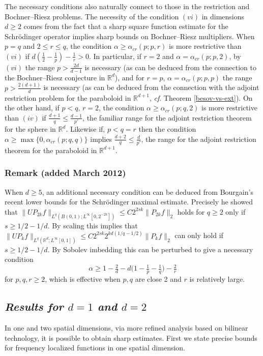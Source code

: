 \documentclass[11pt]{amsart}
\theoremstyle{definition}
\numberwithin{theorem}{section}
\numberwithin{definition}{section}
\numberwithin{equation}{section}
\renewcommand{\le}{\leqslant}
\renewcommand{\ge}{\geqslant}
\def\cf{{\it cf}}
\def\bbR{{\mathbb {R}}}
\renewcommand{\le}{\leqslant}
\renewcommand{\ge}{\geqslant}
\begin{document}
The necessary conditions also naturally  connect to those in the
restriction and Bochner--Riesz problems.
 The necessity of the condition  $(vi)$ in dimensions $d\ge 2$ comes  from
the fact that a sharp square function estimate for the Schr\"odinger
operator  implies sharp bounds on Bochner--Riesz multipliers.  When
$p=q$ and $2\le r\le q$, the condition $\alpha\ge
\alpha_{cr}(p;p,r)$
is more restrictive than
$(vi)$  if $d(\frac 12-\frac 1p)-\frac 1r>0$.
In particular, if  $r=2$ and
$\alpha= \alpha_{cr}(p;p,2)$,  by $(vi)$  the  range  $p>\frac{2d}{d-1}$
is necessary
(as can be deduced from the connection to the Bochner--Riesz
conjecture in $\bbR^d$),
and  for $r=p$, $\alpha= \alpha_{cr}(p;p,p)$
 the  range $p>\frac{2(d+1)}{d}$ is necessary
  (as can be deduced from the connection with the adjoint restriction problem  for the
paraboloid in $\bbR^{d+1}$, \cf. Theorem \ref{besov-vs-ext}).  On the other hand, if  $p<q$, $r=2$,  the condition $ \alpha\ge
\alpha_{cr} (p;q,2)$ is more restrictive than $(iv)$ if
$\frac{d+1}q\le \frac{d-1}{p'}$,  the familiar range for the adjoint
restriction theorem for  the sphere in $\bbR^d$. Likewise if,
$p<q=r$ then the condition $ \alpha\ge  \max\{0,\alpha_{cr}
(p;q,q)\}$ implies $\frac{d+2}q\le \frac{d}{p'}$, the range for the
adjoint restriction theorem for  the paraboloid in  $\bbR^{d+1}$.

\subsubsection*{Remark (added March 2012)} When $d\ge 5$, an additional  necessary condition  can be deduced from
Bourgain's recent lower bounds for the Schr\"odinger maximal
estimate. Precisely he showed that $ \|UP_{2k}
f\|_{L^{q}(B(0,1);L^\infty[0,2^{-2k}])}\le C 2^{2sk}\|P_{2k}f\|_{2}
$ holds for $q\ge 2$ only if $s\ge 1/2-1/d$.  By scaling this
implies that $ \|UP_{k} f\|_{L^{q}(\mathbb
R^d;L^\infty[0,1])}\le C 2^{2sk}2^{kd(1/q-1/2)}\|P_{k}f\|_{2} $ can only hold
if $s\ge 1/2-1/d$. By Sobolev imbedding this can be perturbed to
give a necessary condition $$\alpha\ge 1-\tfrac{2}{d}
-d\big(1-\tfrac1p-\tfrac 1q\big)-\tfrac2r$$ for  $p,q,r\ge 2$, which is
effective when $p,q$ are close 2 and $r$ is relatively large.






\subsection*{\it Results for $d=1$  and $d=2$}
In one and two spatial dimensions,  via more refined analysis based
on bilinear technology,  it is possible to obtain sharp estimates.
First  we state   precise bounds for frequency localized functions
in one spatial dimension.
\end{document}
